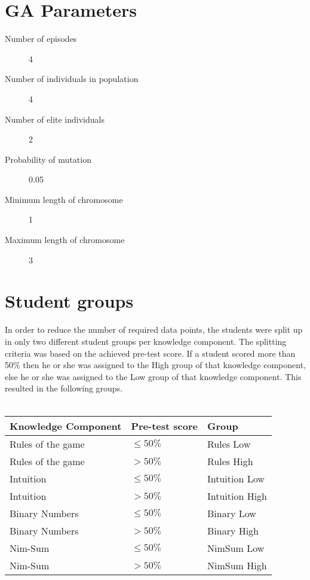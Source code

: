 \section{GA Parameters}
\begin{description}
	\item[Number of episodes] 4
	\item[Number of individuals in population] 4
	\item[Number of elite individuals] 2
	\item[Probability of mutation] 0.05
	\item[Minimum length of chromosome] 1
	\item[Maximum length of chromosome] 3
\end{description}
\section{Student groups}
In order to reduce the number of required data points, the students were split
up in only two different student groups per knowledge component. The splitting
criteria was based on the achieved pre-test score. If a student scored more
than 50\% then he or she was assigned to the High group of that knowledge
component, else he or she was assigned to the Low group of that knowledge
component. This resulted in the following groups.\\\\
\begin{tabular}{l|l||l}
	\textbf{Knowledge Component} & \textbf{Pre-test score}    & \textbf{Group} \\\hline\hline
	Rules of the game	& $\leq 50\%$		& Rules Low \\\hline
	Rules of the game	& $> 50\%$			& Rules High \\\hline
	Intuition			& $\leq 50\%$		& Intuition Low \\\hline
	Intuition			& $> 50\%$			& Intuition High \\\hline
	Binary Numbers		& $\leq 50\%$		& Binary Low \\\hline
	Binary Numbers		& $> 50\%$			& Binary High \\\hline
	Nim-Sum				& $\leq 50\%$		& NimSum Low \\\hline
	Nim-Sum				& $> 50\%$			& NimSum High \\\hline
\end{tabular}
